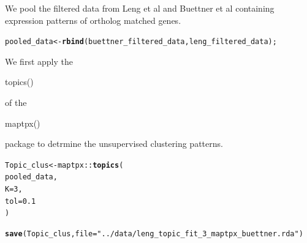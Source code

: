 \documentclass[12pt]{article}\usepackage[]{graphicx}\usepackage[usenames,dvipsnames]{color}
\makeatletter
\newcommand{\hlnum}[1]{\textcolor[rgb]{0.686,0.059,0.569}{#1}}%
\newcommand{\hlstr}[1]{\textcolor[rgb]{0.192,0.494,0.8}{#1}}%
\newcommand{\hlopt}[1]{\textcolor[rgb]{0,0,0}{#1}}%
\newcommand{\hlstd}[1]{\textcolor[rgb]{0.345,0.345,0.345}{#1}}%
\newcommand{\hlkwb}[1]{\textcolor[rgb]{0.69,0.353,0.396}{#1}}%
\newcommand{\hlkwc}[1]{\textcolor[rgb]{0.333,0.667,0.333}{#1}}%
\newcommand{\hlkwd}[1]{\textcolor[rgb]{0.737,0.353,0.396}{\textbf{#1}}}%
\newenvironment{kframe}{%
 \def\at@end@of@kframe{}%
 \ifinner\ifhmode%
  \def\at@end@of@kframe{\end{minipage}}%
  \begin{minipage}{\columnwidth}%
 \fi\fi%
 \def\FrameCommand##1{\hskip\@totalleftmargin \hskip-\fboxsep
 \colorbox{shadecolor}{##1}\hskip-\fboxsep
     \hskip-\linewidth \hskip-\@totalleftmargin \hskip\columnwidth}%
 \MakeFramed {\advance\hsize-\width
   \@totalleftmargin\z@ \linewidth\hsize
   \@setminipage}}%
 {\par\unskip\endMakeFramed%
 \at@end@of@kframe}
\newenvironment{knitrout}{}{} %
\makeatother
\begin{document}
We pool the filtered data from Leng et al and Buettner et al containing expression patterns of ortholog matched genes.

\begin{knitrout}
\color{fgcolor}\begin{kframe}
\begin{alltt}
\hlstd{pooled_data} \hlkwb{<-} \hlkwd{rbind}\hlstd{(buettner_filtered_data, leng_filtered_data);}
\end{alltt}
\end{kframe}
\end{knitrout}

We first apply the \begin{verb} topics() \end{verb} of the \begin{verb} maptpx() \end{verb} package to detrmine the unsupervised clustering patterns. 

\begin{knitrout}
\color{fgcolor}\begin{kframe}
\begin{alltt}
\hlstd{Topic_clus} \hlkwb{<-} \hlstd{maptpx}\hlopt{::}\hlkwd{topics}\hlstd{(}
    \hlstd{pooled_data,}
    \hlkwc{K}\hlstd{=}\hlnum{3}\hlstd{,}
    \hlkwc{tol}\hlstd{=}\hlnum{0.1}
    \hlstd{)}

\hlkwd{save}\hlstd{(Topic_clus,} \hlkwc{file}\hlstd{=}\hlstr{"../data/leng_topic_fit_3_maptpx_buettner.rda"}\hlstd{)}
\end{alltt}
\end{kframe}
\end{knitrout}
\end{document}
